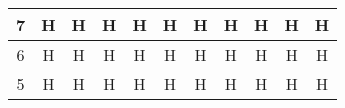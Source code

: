 \documentclass[conference]{IEEEtran}
\begin{document}
\begin{table}[h]
\begin{tabular}{|c|c|c|c|c|c|c|c|c|c|c|}
7 & \cellcolor[HTML]{FE0000}H & \cellcolor[HTML]{FE0000}H & \cellcolor[HTML]{FE0000}H & \cellcolor[HTML]{FE0000}H & \cellcolor[HTML]{FE0000}H & \cellcolor[HTML]{FE0000}H & \cellcolor[HTML]{FE0000}H & \cellcolor[HTML]{FE0000}H & \cellcolor[HTML]{FE0000}H & \cellcolor[HTML]{FE0000}H \\ \hline
6 & \cellcolor[HTML]{FE0000}H & \cellcolor[HTML]{FE0000}H & \cellcolor[HTML]{FE0000}H & \cellcolor[HTML]{FE0000}H & \cellcolor[HTML]{FE0000}H & \cellcolor[HTML]{FE0000}H & \cellcolor[HTML]{FE0000}H & \cellcolor[HTML]{FE0000}H & \cellcolor[HTML]{FE0000}H & \cellcolor[HTML]{FE0000}H \\ \hline
5 & \cellcolor[HTML]{FE0000}H & \cellcolor[HTML]{FE0000}H & \cellcolor[HTML]{FE0000}H & \cellcolor[HTML]{FE0000}H & \cellcolor[HTML]{FE0000}H & \cellcolor[HTML]{FE0000}H & \cellcolor[HTML]{FE0000}H & \cellcolor[HTML]{FE0000}H & \cellcolor[HTML]{FE0000}H & \cellcolor[HTML]{FE0000}H \\ \hline
\end{tabular}
\end{table}
\end{document}
